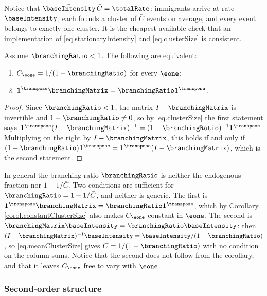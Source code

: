 \begin{remark}\label{remark.clusterBudget}
 Notice that $\bar{\baseIntensity}\,\bar{C} = \totalRate$:
 immigrants arrive at rate $\bar{\baseIntensity}$,
 each founds a cluster of $\bar C$ events on average,
 and every event belongs to exactly one cluster.
 It is the cheapest available check that an implementation of
 \eqref{eq.stationaryIntensity} and \eqref{eq.clusterSize} is consistent.
\end{remark}

\begin{corol}\label{corol.constantClusterSize}
 Assume $\branchingRatio < 1$.
 The following are equivalent:
 \begin{enumerate}[label={\emph{\roman{*}}.}]
  \item $C_{\eone} = 1/(1-\branchingRatio)$ for every $\eone$;
  \item $\mathbf{1}^{\transpose}\branchingMatrix
        = \branchingRatio\mathbf{1}^{\transpose}$.
 \end{enumerate}
\end{corol}
\begin{proof}
 Since $\branchingRatio < 1$, the matrix $I - \branchingMatrix$ is invertible and
 $1 - \branchingRatio \neq 0$, so by \eqref{eq.clusterSize} the first statement says
 $\mathbf{1}^{\transpose}(I-\branchingMatrix)^{-1}
 = (1-\branchingRatio)^{-1}\mathbf{1}^{\transpose}$.
 Multiplying on the right by $I - \branchingMatrix$,
 this holds if and only if
 $(1-\branchingRatio)\mathbf{1}^{\transpose}
 = \mathbf{1}^{\transpose}(I - \branchingMatrix)$,
 which is the second statement.
\end{proof}

In general the branching ratio $\branchingRatio$
is neither the endogenous fraction nor $1-1/\bar C$.
Two conditions are sufficient for $\branchingRatio = 1 - 1/\bar C$, and neither is generic.
The first is $\mathbf{1}^{\transpose}\branchingMatrix
= \branchingRatio \mathbf{1}^{\transpose}$,
which by Corollary \ref{corol.constantClusterSize} also makes $C_{\eone}$ constant in
$\eone$.
The second is $\branchingMatrix\baseIntensity = \branchingRatio\baseIntensity$:
then $(I-\branchingMatrix)^{-1}\baseIntensity
= \baseIntensity/(1-\branchingRatio)$, so \eqref{eq.meanClusterSize} gives
$\bar C = 1/(1-\branchingRatio)$ with no condition on the column sums.
Notice that the second does not follow from the corollary,
and that it leaves $C_{\eone}$ free to vary with $\eone$.

\subsubsection{Second-order structure}
\label{sec.secondOrder}

